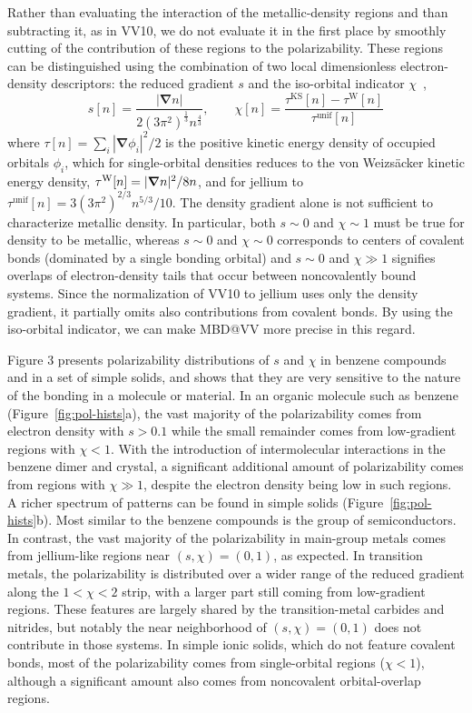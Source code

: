 Rather than evaluating the interaction of the metallic-density regions and than subtracting it, as in VV10, we do not evaluate it in the first place by smoothly cutting of the contribution of these regions to the polarizability.
These regions can be distinguished using the combination of two local dimensionless electron-density descriptors: the reduced gradient $s$ and the iso-orbital indicator $\chi$~\citep{BeckeJCP90,KummelMP03,SunPRL13},
\begin{equation}
  s[n]=\frac{|\boldsymbol\nabla n|}{2{(3\pi^2)}^\frac13n^\frac43},\qquad
  \chi[n]=\frac{\tau^\text{KS}[n]-\tau^\text{W}[n]}{\tau^\text{unif}[n]}
\end{equation}
where $\tau[n]=\sum_i|\boldsymbol\nabla\phi_i|^2/2$ is the positive kinetic energy density of occupied orbitals $\phi_i$, which for single-orbital densities reduces to the von Weizsäcker kinetic energy density, $\tau^\text W[n]=|\boldsymbol\nabla n|^2/8n$, and for jellium to $\tau^\mathrm{unif}[n]=3(3\pi^2)^{2/3}n^{5/3}/10$.  %
The density gradient alone is not sufficient to characterize metallic density.
In particular, both $s\sim0$ and $\chi\sim1$ must be true for density to be metallic, whereas $s\sim0$ and $\chi\sim0$ corresponds to centers of covalent bonds (dominated by a single bonding orbital) and $s\sim0$ and $\chi\gg1$ signifies overlaps of electron-density tails that occur between noncovalently bound systems.
Since the normalization of VV10 to jellium uses only the density gradient, it partially omits also contributions from covalent bonds.
By using the iso-orbital indicator, we can make MBD@VV more precise in this regard.

Figure 3 presents polarizability distributions of $s$ and $\chi$ in benzene compounds and in a set of simple solids, and shows that they are very sensitive to the nature of the bonding in a molecule or material.
In an organic molecule such as benzene (Figure~\ref{fig:pol-hists}a), the vast majority of the polarizability
comes from electron density with $s>0.1$ while the small remainder comes
from low-gradient regions with $\chi<1$.
With the introduction of intermolecular interactions in the benzene dimer and crystal, a significant additional amount of polarizability comes from regions with $\chi\gg1$, despite the electron density being low in such regions.
A richer spectrum of patterns can be found in simple solids (Figure~\ref{fig:pol-hists}b).
Most similar to the benzene compounds is the group of semiconductors.
In contrast, the vast majority of the polarizability in main-group metals comes from jellium-like regions near $(s,\chi)=(0,1)$, as expected.
In transition metals, the polarizability is distributed over a wider range of the reduced gradient along the $1<\chi<2$ strip, with a larger part still coming from low-gradient regions.
These features are largely shared by the transition-metal carbides and nitrides, but notably the near neighborhood of $(s,\chi)=(0,1)$ does not contribute in those systems.
In simple ionic solids, which do not feature covalent bonds, most of the
polarizability comes from single-orbital regions ($\chi<1$), although a
significant amount also comes from noncovalent orbital-overlap regions.

